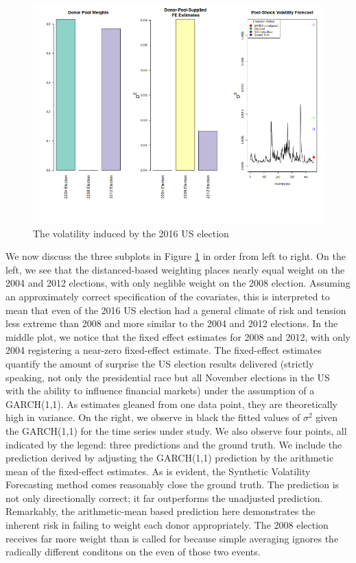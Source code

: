 \documentclass[11pt]{article}
\theoremstyle{definition}
\begin{document}
\begin{figure}[h!]
\begin{center}
  \includegraphics[scale=.5]{real_data_output_plots/savetime_WedJan1010:56:32PM2024_IYG_CL=F-^VIX-^IRX-^FVX-^TNX-^TYX_^VIX_2016-11-08-2004-11-02-2008-11-04-2012-11-06.png}
  \caption{The volatility induced by the 2016 US election}
  \label{fig:SVF_2016}
  \end{center}
\end{figure}

We now discuss the three subplots in Figure \ref{fig:SVF_2016} in order from left to right.  On the left, we see that the distanced-based weighting places nearly equal weight on the 2004 and 2012 elections, with only neglible weight on the 2008 election.  Assuming an approximately correct specification of the covariates, this is interpreted to mean that even of the 2016 US election had a general climate of risk and tension less extreme than 2008 and more similar to the 2004 and 2012 elections.  In the middle plot, we notice that the fixed effect estimates for 2008 and 2012, with only 2004 registering a near-zero fixed-effect estimate.  The fixed-effect estimates quantify the amount of surprise the US election results delivered (strictly speaking, not only the presidential race but all November elections in the US with the ability to influence financial markets) under the assumption of a GARCH(1,1).  As estimates gleaned from one data point, they are theoretically high in variance.  On the right, we observe in black the fitted values of $\sigma^{2}$ given the GARCH(1,1) for the time series under study.  We also observe four points, all indicated by the legend: three predictions and the ground truth.  We include the prediction derived by adjusting the GARCH(1,1) prediction by the arithmetic mean of the fixed-effect estimates.  As is evident, the Synthetic Volatility Forecasting method comes reasonably close the ground truth.  The prediction is not only directionally correct; it far outperforms the unadjusted prediction.  Remarkably, the arithmetic-mean based prediction here demonstrates the inherent risk in failing to weight each donor appropriately.  The 2008 election receives far more weight than is called for because simple averaging ignores the radically different conditons on the even of those two events.
\end{document}
